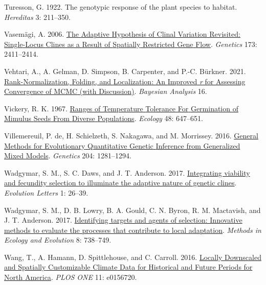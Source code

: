 \documentclass[
  12pt,
]{article}
\newlength{\cslhangindent}
\newlength{\cslentryspacingunit} %
\newenvironment{CSLReferences}[2] %
 {%
  \setlength{\parindent}{0pt}
  \ifodd #1
  \let\oldpar\par
  \def\par{\hangindent=\cslhangindent\oldpar}
  \fi
  \setlength{\parskip}{#2\cslentryspacingunit}
 }%
 {}
\begin{document}
\begin{CSLReferences}{1}{0}
\leavevmode{}%
Turesson, G. 1922. The genotypic response of the plant species to habitat. \emph{Hereditas} 3: 211--350.

\leavevmode{}%
Vasemägi, A. 2006. \href{https://doi.org/10.1534/genetics.106.059881}{The {Adaptive} {Hypothesis} of {Clinal} {Variation} {Revisited}: {Single}-{Locus} {Clines} as a {Result} of {Spatially} {Restricted} {Gene} {Flow}}. \emph{Genetics} 173: 2411--2414.

\leavevmode{}%
Vehtari, A., A. Gelman, D. Simpson, B. Carpenter, and P.-C. Bürkner. 2021. \href{https://doi.org/10.1214/20-BA1221}{Rank-{Normalization}, {Folding}, and {Localization}: {An} {Improved} \emph{r} for {Assessing} {Convergence} of {MCMC} (with {Discussion})}. \emph{Bayesian Analysis} 16.

\leavevmode{}%
Vickery, R. K. 1967. \href{https://doi.org/10.2307/1936508}{Ranges of {Temperature} {Tolerance} {For} {Germination} of {Mimulus} {Seeds} {From} {Diverse} {Populations}}. \emph{Ecology} 48: 647--651.

\leavevmode{}%
Villemereuil, P. de, H. Schielzeth, S. Nakagawa, and M. Morrissey. 2016. \href{https://doi.org/10.1534/genetics.115.186536}{General {Methods} for {Evolutionary} {Quantitative} {Genetic} {Inference} from {Generalized} {Mixed} {Models}}. \emph{Genetics} 204: 1281--1294.

\leavevmode{}%
Wadgymar, S. M., S. C. Daws, and J. T. Anderson. 2017. \href{https://doi.org/10.1002/evl3.3}{Integrating viability and fecundity selection to illuminate the adaptive nature of genetic clines}. \emph{Evolution Letters} 1: 26--39.

\leavevmode{}%
Wadgymar, S. M., D. B. Lowry, B. A. Gould, C. N. Byron, R. M. Mactavish, and J. T. Anderson. 2017. \href{https://doi.org/10.1111/2041-210X.12777}{Identifying targets and agents of selection: Innovative methods to evaluate the processes that contribute to local adaptation}. \emph{Methods in Ecology and Evolution} 8: 738--749.

\leavevmode{}%
Wang, T., A. Hamann, D. Spittlehouse, and C. Carroll. 2016. \href{https://doi.org/10.1371/journal.pone.0156720}{Locally {Downscaled} and {Spatially} {Customizable} {Climate} {Data} for {Historical} and {Future} {Periods} for {North} {America}}. \emph{PLOS ONE} 11: e0156720.


\end{CSLReferences}
\end{document}
